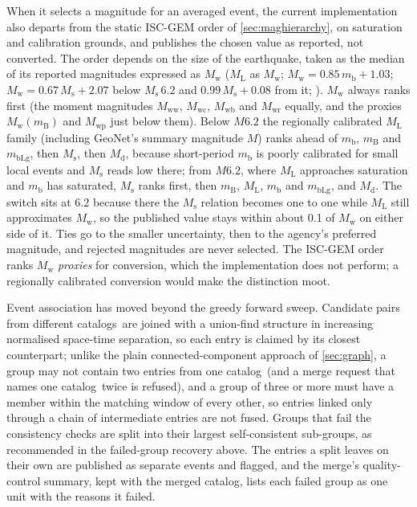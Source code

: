 \documentclass[12pt]{article}
\newcommand{\catalog}{catalog}
\newcommand{\catalogs}{catalogs}
\begin{document}
When it selects a magnitude for an averaged event, the current implementation
also departs from the static ISC-GEM order of \cref{sec:maghierarchy}, on
saturation and calibration grounds, and publishes the chosen value as reported,
not converted.  The order depends on the size of the earthquake, taken as the
median of its reported magnitudes expressed as $M_\mathrm{w}$ ($M_\mathrm{L}$ as
$M_\mathrm{w}$; $M_\mathrm{w} = 0.85\,m_\mathrm{b} + 1.03$; $M_\mathrm{w} =
0.67\,M_\mathrm{s} + 2.07$ below $M_\mathrm{s}\,6.2$ and $0.99\,M_\mathrm{s} +
0.08$ from it; \citealp{Scordilis2006}).  $M_\mathrm{w}$ always ranks first
(the moment magnitudes $M_\mathrm{ww}$, $M_\mathrm{wc}$, $M_\mathrm{wb}$ and
$M_\mathrm{wr}$ equally, and the proxies $M_\mathrm{w}(m_\mathrm{B})$ and
$M_\mathrm{wp}$ just below them).  Below $M6.2$ the
regionally calibrated $M_\mathrm{L}$ family (including GeoNet's summary
magnitude $M$) ranks ahead of $m_\mathrm{b}$, $m_\mathrm{B}$ and
$m_\mathrm{bLg}$, then $M_\mathrm{s}$, then $M_\mathrm{d}$, because short-period
$m_\mathrm{b}$ is poorly calibrated for small local events and $M_\mathrm{s}$
reads low there; from $M6.2$, where $M_\mathrm{L}$ approaches saturation and
$m_\mathrm{b}$ has saturated, $M_\mathrm{s}$ ranks first, then $m_\mathrm{B}$,
$M_\mathrm{L}$, $m_\mathrm{b}$ and $m_\mathrm{bLg}$, and $M_\mathrm{d}$.  The
switch sits at 6.2 because there the $M_\mathrm{s}$ relation becomes one to one
while $M_\mathrm{L}$ still approximates $M_\mathrm{w}$, so the published value
stays within about 0.1 of $M_\mathrm{w}$ on either side of it.  Ties go to the
smaller uncertainty, then to the agency's preferred magnitude, and rejected
magnitudes are never selected.  The ISC-GEM order ranks $M_\mathrm{w}$ \emph{proxies} for
conversion, which the implementation does not perform; a regionally calibrated
conversion would make the distinction moot.

Event association has moved beyond the greedy forward sweep.  Candidate pairs
from different \catalogs\ are joined with a union-find structure in increasing
normalised space-time separation, so each entry is claimed by its closest
counterpart; unlike the plain connected-component approach of \cref{sec:graph},
a group may not contain two entries from one \catalog\ (and a merge request that
names one \catalog\ twice is refused), and a group of three or more must have a
member within the matching window of every other, so entries
linked only through a chain of intermediate entries are not fused.  Groups that
fail the consistency checks are split into their largest self-consistent
sub-groups, as recommended in the failed-group recovery above.  The entries a
split leaves on their own are published as separate events and flagged, and the
merge's quality-control summary, kept with the merged \catalog, lists each
failed group as one unit with the reasons it failed.
\end{document}
